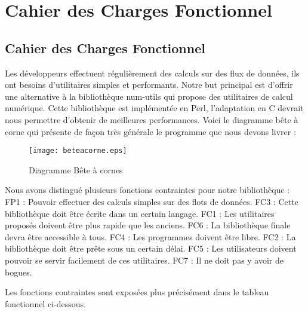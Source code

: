 \chapter{Cahier des Charges Fonctionnel}

\section{Cahier des Charges Fonctionnel}
Les d\'eveloppeurs effectuent r\'eguli\`erement des calculs sur des flux de donn\'ees, ils ont besoins d'utilitaires simples et performants.
Notre but principal est d'offrir une alternative \`a la biblioth\`eque num-utils qui propose des utilitaires de calcul num\'erique. 
Cette biblioth\`eque est impl\'ement\'ee en Perl, l'adaptation en C devrait nous permettre d'obtenir de meilleures performances.
Voici le diagramme b\^ete \`a corne qui pr\'esente de fa\c con tr\`es g\'en\'erale le programme que nous devons livrer : 

\begin{figure}[h]
\begin{center}
\texttt{[image: beteacorne.eps]}
\end{center}
\caption{Diagramme B\^ete \`a cornes}
\label{fig:numprocess}
\end{figure}

Nous avons distingu\'e plusieurs fonctions contraintes pour notre biblioth\`eque : 
\newline
FP1 : Pouvoir effectuer des calculs simples sur des flots de donn\'ees.
\newline
FC3 : Cette biblioth\`eque doit \^etre \'ecrite dans un certain langage.
\newline
FC1 : Les utilitaires propos\'es doivent \^etre plus rapide que les anciens.
\newline
FC6 : La biblioth\`eque finale devra \^etre accessible  \`a tous.
\newline
FC4 : Les programmes doivent \^etre libre.
\newline
FC2 : La biblioth\`eque doit \^etre pr\^ete sous un certain d\'elai.
\newline
FC5 : Les utilisateurs doivent pouvoir se servir facilement de ces utilitaires.
\newline
FC7 : Il ne doit pas y avoir de bogues.
\newline


Les fonctions contraintes sont expos\'ees plus pr\'ecis\'ement dans le tableau fonctionnel ci-dessous.

